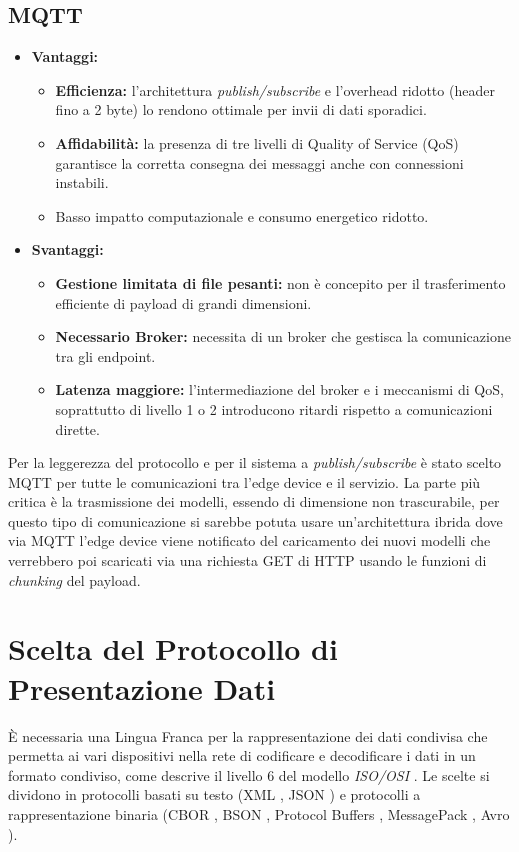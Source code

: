 \subsection{MQTT}
\begin{itemize}
	\item \textbf{Vantaggi:}
	\begin{itemize}
		\item \textbf{Efficienza:} l'architettura \textit{publish/subscribe} e l'overhead ridotto (header fino a 2 byte) lo rendono ottimale per invii di dati sporadici.
		\item \textbf{Affidabilità:} la presenza di tre livelli di Quality of Service (QoS) garantisce la corretta consegna dei messaggi anche con connessioni instabili.
		\item Basso impatto computazionale e consumo energetico ridotto.
	\end{itemize}
	\item \textbf{Svantaggi:}
	\begin{itemize}
		\item \textbf{Gestione limitata di file pesanti:} non è concepito per il trasferimento efficiente di payload di grandi dimensioni.
		\item \textbf{Necessario Broker:} necessita di un broker che gestisca la comunicazione tra gli endpoint.
		\item \textbf{Latenza maggiore:} l'intermediazione del broker e i meccanismi di QoS, soprattutto di livello 1 o 2 introducono ritardi rispetto a comunicazioni dirette.

	\end{itemize}
\end{itemize}

Per la leggerezza del protocollo e per il sistema a \textit{publish/subscribe} è stato scelto MQTT per tutte le comunicazioni tra l'edge device e il servizio.
La parte più critica è la trasmissione dei modelli, essendo di dimensione non trascurabile, per questo tipo di comunicazione si sarebbe potuta usare un'architettura ibrida dove via MQTT l'edge device viene notificato del caricamento dei nuovi modelli che verrebbero poi scaricati via una richiesta GET di HTTP usando le funzioni di \textit{chunking} del payload.

\section{Scelta del Protocollo di Presentazione Dati}
\label{sec:scelta_cbor}
È necessaria una Lingua Franca per la rappresentazione dei dati condivisa che permetta ai vari dispositivi nella rete di codificare e decodificare i dati in un formato condiviso, come descrive il livello 6 del modello \textit{ISO/OSI} \cite{isoosi}.
Le scelte si dividono in protocolli basati su testo (XML \cite{bray2008xml}, JSON \cite{bray2017json}) e protocolli a rappresentazione binaria (CBOR \cite{bormann2020cbor}, BSON \cite{bson2009spec}, Protocol Buffers \cite{varda2008protobuf}, MessagePack \cite{furuhashi2013msgpack}, Avro \cite{apache2011avro}).


